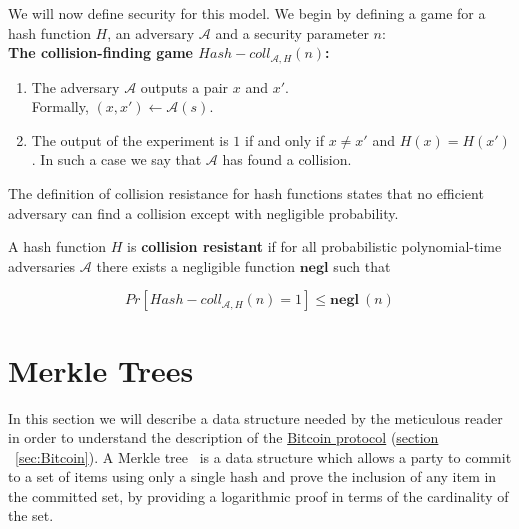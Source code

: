 We will now define security for this model. We begin by defining a game for a hash function $H$, an adversary $\mathcal{A}$ and a security parameter $n$:
\\

\textbf{The collision-finding game ${Hash-coll}_{\mathcal{A},H}(n)$:} \cite{Katz:2007:IMC:1206501}
\begin{enumerate}
  \item The adversary $\mathcal{A}$ outputs a pair $x$ and $x'$. \\
  Formally, $(x,x') \leftarrow \mathcal{A}(s)$.
  \item The output of the experiment is $1$ if and only if $x \neq x'$ and $H(x) = H(x')$. In such a case we say that $\mathcal{A}$ has found a collision.
\end{enumerate}
%
The definition of collision resistance for hash functions states that no efficient adversary can find a collision except with negligible probability.
%
\begin{definition} \textnormal{\cite{Katz:2007:IMC:1206501}}
  A hash function $H$ is \textbf{collision resistant} if for all probabilistic polynomial-time adversaries $\mathcal{A}$ there exists a negligible function $\textbf{negl}$ such that

\begin{equation} \label{eqn:collision}
  Pr[{Hash-coll}_{\mathcal{A},H}(n) = 1] \leq \textbf{negl} \: (n)
\end{equation}
\end{definition}
%
%
\section{Merkle Trees} \label{sec:merkle-trees}
In this section we will describe a data structure needed by the meticulous reader in order to understand the description of the \hyperref[sec:Bitcoin]{Bitcoin protocol} (\hyperref[sec:Bitcoin]{section }~\ref{sec:Bitcoin}).
A Merkle tree~\cite{merkle} is a data structure which allows a party to commit to a set of items using only a single hash and prove the inclusion of any item in the committed set, by providing a logarithmic proof in terms of the cardinality of the set.

